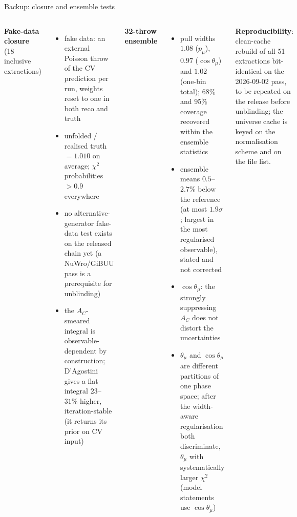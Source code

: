\documentclass[aspectratio=169,10pt]{beamer}
\begin{document}
\begin{frame}{Backup: closure and ensemble tests}
  \footnotesize
  \begin{columns}[T]
  \textbf{Fake-data closure} (18 inclusive extractions)
  \begin{itemize}\itemsep2pt
    \item fake data: an external Poisson throw of the CV prediction per run, weights reset to one in both reco and truth
    \item unfolded / realised truth $=1.010$ on average; $\chi^2$ probabilities $>0.9$ everywhere
    \item no alternative-generator fake-data test exists on the released chain yet (a NuWro/GiBUU pass is a prerequisite for unblinding)
    \item the $A_C$-smeared integral is observable-dependent by construction; D'Agostini gives a flat integral $23$--$31\%$ higher, iteration-stable (it returns its prior on CV input)
  \end{itemize}
  \textbf{32-throw ensemble}
  \begin{itemize}\itemsep2pt
    \item pull widths $1.08$ ($p_\mu$), $0.97$ ($\cos\theta_\mu$) and $1.02$ (one-bin total); 68\% and 95\% coverage recovered within the ensemble statistics
    \item ensemble means $0.5$--$2.7\%$ below the reference (at most $1.9\sigma$; largest in the most regularised observable), stated and not corrected
    \item $\cos\theta_\mu$: the strongly suppressing $A_C$ does not distort the uncertainties
    \item $\theta_\mu$ and $\cos\theta_\mu$ are different partitions of one phase space; after the width-aware regularisation both discriminate, $\theta_\mu$ with systematically larger $\chi^2$ (model statements use $\cos\theta_\mu$)
  \end{itemize}
  \vspace{4pt}
  \textbf{Reproducibility}: clean-cache rebuild of all 51 extractions bit-identical on the 2026-09-02 pass, to be repeated on the release before unblinding; the universe cache is keyed on the normalisation scheme and on the file list.
  \end{columns}
\end{frame}
\end{document}
